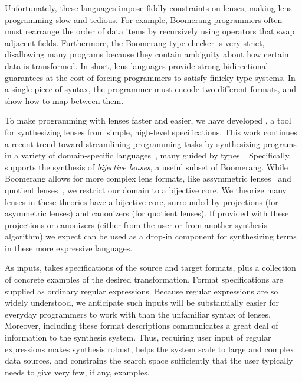 \documentclass[sigplan,acmsmall]{acmart}
\begin{document}
%
Unfortunately, these languages impose fiddly constraints on lenses,
making lens programming slow and tedious.
For example, Boomerang
programmers often must rearrange the order of data items by recursively
using operators that swap adjacent fields.
Furthermore, the Boomerang type checker is very strict, disallowing many programs
because they contain ambiguity about how certain data is transformed.
In short, lens languages provide strong bidirectional guarantees at the cost of
forcing programmers to satisfy finicky type systems.  In a single piece of
syntax, the programmer must encode two different formats, and show how to map
between them.

To make programming with lenses faster and easier, we have
developed \emph{\Optician{}}, a
tool for synthesizing lenses from simple, high-level specifications.
This work continues a recent trend toward streamlining programming tasks
by synthesizing programs in a variety of domain-specific
languages~\cite{flashfill,le-pldi-2014,perelman2014test,morpheus},
many guided by
types~\cite{osera+:pldi15,frankle+:popl16,armando+:pldi16,feser-pldi-2015,morpheus}.  
Specifically, \Optician{} supports the synthesis of \emph{bijective lenses}, a
useful subset of Boomerang.  While Boomerang allows for more complex lens
formats, like assymmetric lenses~\cite{?} and quotient lenses~\cite{?}, we
restrict our domain to a bijective core.
We theorize many lenses in these theories have a bijective core, surrounded by
projections (for asymmetric lenses) and canonizers (for quotient lenses).  If
provided with these projections or canonizers (either from the user or
from another synthesis algorithm) we expect \Optician{} can be used as a drop-in
component for synthesizing terms in these more expressive languages.

As inputs, \Optician{} takes specifications of the source and target formats, plus
a collection of concrete examples of the desired 
transformation.  Format specifications are supplied as ordinary regular
expressions.
Because regular expressions are so widely understood, we anticipate such
inputs will be substantially easier for everyday programmers to work with
than the unfamiliar syntax of lenses.  Moreover, including these format
descriptions communicates a
great deal of information to the synthesis system.  Thus, requiring user input
of regular expressions
makes synthesis robust, 
helps the system scale to large and complex data sources, and 
constrains the search space sufficiently that the user typically needs
to give very few, if any, examples.
\end{document}
